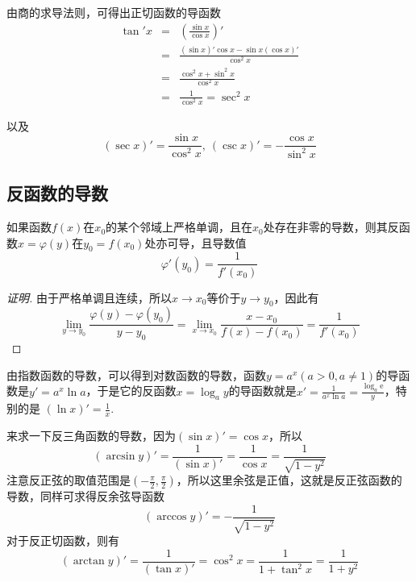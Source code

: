 \begin{example}
  由商的求导法则，可得出正切函数的导函数
  \begin{eqnarray*}
    \tan'{x} & = & \left( \frac{\sin{x}}{\cos{x}} \right)'  \\
             & = & \frac{(\sin{x})'\cos{x}-\sin{x}(\cos{x})'}{\cos^2{x}} \\
             & = & \frac{\cos^2{x}+\sin^2{x}}{\cos^2{x}} \\
    & = & \frac{1}{\cos^2{x}} = \sec^2{x}
  \end{eqnarray*}

  以及
  \[ (\sec{x})' = \frac{\sin{x}}{\cos^2{x}}, \  (\csc{x})'=-\frac{\cos{x}}{\sin^2{x}} \]
\end{example}


\subsection{反函数的导数}
\label{sec:derivative-of-revert-function}

\begin{theorem}
  如果函数$f(x)$在$x_0$的某个邻域上严格单调，且在$x_0$处存在非零的导数，则其反函数$x=\varphi(y)$在$y_0=f(x_0)$处亦可导，且导数值
  \[ \varphi '(y_0) = \frac{1}{f'(x_0)} \]
\end{theorem}

\begin{proof}[证明]
  由于严格单调且连续，所以$x \to x_0$等价于$y \to y_0$，因此有
  \[ \lim_{y \to y_0} \frac{\varphi(y)-\varphi(y_0)}{y-y_0} = \lim_{x \to x_0} \frac{x-x_0}{f(x)-f(x_0)} = \frac{1}{f'(x_0)} \]
\end{proof}

\begin{example}
  由指数函数的导数，可以得到对数函数的导数，函数$y=a^x(a>0, a \neq 1)$的导函数是$y'=a^x \ln{a}$，于是它的反函数$x=\log_a y$的导函数就是$x'=\frac{1}{a^x \ln{a}}=\frac{\log_a \mathrm{e}}{y}$，特别的是 $(\ln{x})'=\frac{1}{x}$.
\end{example}

\begin{example}
  来求一下反三角函数的导数，因为$(\sin{x})'=\cos{x}$，所以
  \[ (\arcsin{y})'=\frac{1}{(\sin{x})'} = \frac{1}{\cos{x}} = \frac{1}{\sqrt{1-y^2}} \]
  注意反正弦的取值范围是$(-\frac{\pi}{2},\frac{\pi}{2})$，所以这里余弦是正值，这就是反正弦函数的导数，同样可求得反余弦导函数
  \[ (\arccos{y})' = - \frac{1}{\sqrt{1-y^2}} \]
  对于反正切函数，则有
  \[ (\arctan{y})' = \frac{1}{(\tan{x})'} = \cos^2{x} = \frac{1}{1+\tan^2{x}} = \frac{1}{1+y^2} \]
\end{example}

